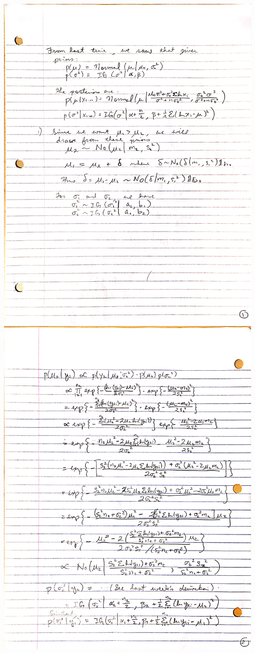 \documentclass{article}
\begin{document}
\begin{enumerate}
\includegraphics[scale = 0.23]{page1.jpg}\\
\includegraphics[scale = 0.23]{page2.jpg}\\

\end{enumerate}
\end{document}

